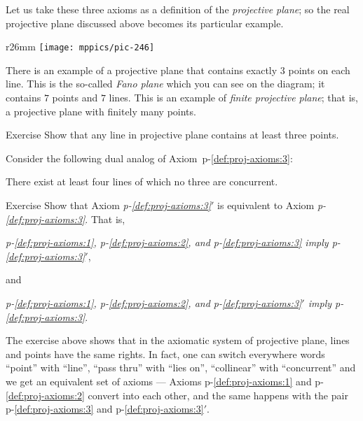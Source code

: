 Let us take these three axioms as a definition of the \emph{projective plane};
so the real projective plane discussed above becomes its particular example.

{

\begin{wrapfigure}{r}{26mm}
\vskip-0mm
\centering
\texttt{[image: mppics/pic-246]}
\end{wrapfigure}

There is an example of a projective plane that contains exactly 3 points on each line.
This is the so-called \emph{Fano plane} which you can see on the diagram;
it contains $7$ points and $7$ lines.
This is an example of \emph{finite projective plane};
that is, a projective plane with finitely many points.

}

\begin{thm}{Exercise}\label{ex:finite-pp}
Show that any line in projective plane contains at least three points.
\end{thm}


Consider the following dual analog of Axiom~p-\ref{def:proj-axioms:3}:

\begin{framed}
There exist at least four lines of which no three are concurrent.
\end{framed}

\begin{thm}{Exercise}\label{ex:3=3'}
Show that Axiom {}\emph{p-\ref{def:proj-axioms:3}$'$} is equivalent to Axiom {}\emph{p-\ref{def:proj-axioms:3}}.
That is, 
\begin{center}
\emph{p-\ref{def:proj-axioms:1}, p-\ref{def:proj-axioms:2}, and p-\ref{def:proj-axioms:3} imply  p-\ref{def:proj-axioms:3}$'$},
\end{center}
and 
\begin{center}
\emph{p-\ref{def:proj-axioms:1}, p-\ref{def:proj-axioms:2}, and p-\ref{def:proj-axioms:3}$'$ imply p-\ref{def:proj-axioms:3}}.
\end{center}

\end{thm}

The exercise above shows that in the axiomatic system of projective plane,
lines and points have the same rights.
In fact, one can switch everywhere words ``point'' with ``line'', ``pass thru'' with ``lies on'', ``collinear'' with ``concurrent'' and we get an equivalent set of axioms ---  Axioms p-\ref{def:proj-axioms:1} and p-\ref{def:proj-axioms:2} convert into each other,
and the same happens with the pair p-\ref{def:proj-axioms:3} and p-\ref{def:proj-axioms:3}$'$.

